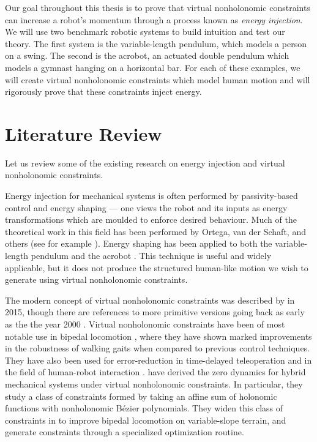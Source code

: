 Our goal throughout this thesis is to prove that virtual
nonholonomic constraints can increase a robot's momentum through a
process known as \textit{energy injection}.
We will use two benchmark robotic systems to build intuition and test
our theory.
The first system is the variable-length pendulum, which models a person
on a swing.
The second is the acrobot, an actuated double pendulum which models a gymnast
hanging on a horizontal bar.
For each of these examples, we will create virtual nonholonomic
constraints which model human motion and will rigorously prove that these
constraints inject energy. 

\section{Literature Review}
Let us review some of the existing research on energy injection and virtual
nonholonomic constraints.

Energy injection for mechanical systems is often performed by passivity-based
control and energy shaping --- one views the robot and its inputs as energy
transformations which are moulded to enforce desired behaviour.
Much of the theoretical work in this field has been performed by Ortega, van der
Schaft, and others (see for example \cite{ida_pbc_underactuation_one,
ida_pbc_acrobot_example,energy_shaping_revisited}).
Energy shaping has been applied to both the variable-length
pendulum \cite{vlp_energy_shaping} and the acrobot
\cite{swingup_acrobot_energy,swingup_giant_acrobot}.
This technique is useful and widely applicable, but it does not
produce the structured human-like motion we wish to generate using virtual
nonholonomic constraints.

The modern concept of virtual nonholonomic constraints was described by
\citet{nhvc_dynamic_walking} in 2015, though there are references to more
primitive versions going back as early as the the year 2000
\cite{vnhc_human_robot_cooperation}.
Virtual nonholonomic constraints have been of most notable use in
bipedal locomotion 
\cite{nhvc_gait_optimization,output_nhvc_bipedal_control},
where they have shown marked improvements in the robustness of walking gaits
when compared to previous control techniques.
They have also been used for error-reduction in time-delayed teleoperation
\cite{vnhc_time_delay_teleop} and in the field of human-robot interaction
\cite{psd_based_vnhc_redundant_manipulator,haptic_vnhc}.
\citet{hybrid_zero_dynamics_bipedal_nhvcs} have derived the 
zero dynamics for hybrid mechanical systems under virtual nonholonomic
constraints.
In particular, they study a class of constraints formed by taking an affine
sum of holonomic functions with nonholonomic B\'{e}zier polynomials.
They widen this class of constraints in \cite{nhvc_incline_walking} to improve
bipedal locomotion on variable-slope terrain, and generate constraints through
a specialized optimization routine.

